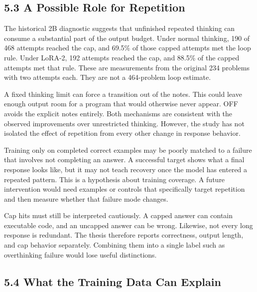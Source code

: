 \documentclass[11pt,letterpaper]{article}
\begin{document}
\subsection*{5.3 A Possible Role for Repetition}

The historical 2B diagnostic suggests that unfinished repeated thinking can consume a substantial part of the output budget. Under normal thinking, 190 of 468 attempts reached the cap, and 69.5\% of those capped attempts met the loop rule. Under LoRA-2, 192 attempts reached the cap, and 88.5\% of the capped attempts met that rule. These are measurements from the original 234 problems with two attempts each. They are not a 464-problem loop estimate.\par

A fixed thinking limit can force a transition out of the notes. This could leave enough output room for a program that would otherwise never appear. OFF avoids the explicit notes entirely. Both mechanisms are consistent with the observed improvements over unrestricted thinking. However, the study has not isolated the effect of repetition from every other change in response behavior.\par

Training only on completed correct examples may be poorly matched to a failure that involves not completing an answer. A successful target shows what a final response looks like, but it may not teach recovery once the model has entered a repeated pattern. This is a hypothesis about training coverage. A future intervention would need examples or controls that specifically target repetition and then measure whether that failure mode changes.\par

Cap hits must still be interpreted cautiously. A capped answer can contain executable code, and an uncapped answer can be wrong. Likewise, not every long response is redundant. The thesis therefore reports correctness, output length, and cap behavior separately. Combining them into a single label such as overthinking failure would lose useful distinctions.\par

\subsection*{5.4 What the Training Data Can Explain}
\end{document}
